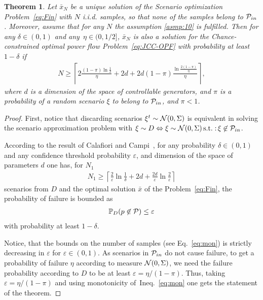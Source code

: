 \documentclass{IEEEtran4PSCC}
\newtheorem{theorem}{Theorem}[section]
\DeclareMathOperator*{\st}{s.t.:}
\newcommand{\cP}{{\cal P}}
\newcommand{\cN}{{\cal N}}
\begin{document}
\begin{theorem}\label{thm:40}
Let $\bar x_N$ be a unique solution of the Scenario optimization Problem~\eqref{eq:Fin} with $N$ i.i.d. samples, so that none of the samples belong to $\cP_{in}$. Moreover, assume that for any $N$ the assumption \ref{asmp:10} is fulfilled. Then for any $\delta \in (0,1)$ and any~$\eta \in (0, 1/2]$, $\bar x_N$ is also a solution for the Chance-constrained optimal power flow Problem~\eqref{eq:JCC-OPF} with probability at least $1-\delta$ if 
\begin{align*}
  N \ge \left\lceil 2\frac{(1-\pi)\ln \frac{1}{\delta}}{\eta} + 2d + 2d (1-\pi) \frac{\ln\frac{2(1-\pi)}{\eta}}{\eta} \right\rceil, 
\end{align*} 
where $d$ is a dimension of the space of controllable generators, and $\pi$ is a probability of a random scenario $\xi$ to belong to $\cP_{in}$, and $\pi < 1$. 
\end{theorem}
\begin{proof}
First, notice that discarding scenarios $\xi^t\sim \cN(0, \Sigma)$ is equivalent in solving the scenario approximation problem with $\xi \sim D \Leftrightarrow \xi\sim \cN(0, \Sigma) \st \xi\not\in \cP_{in}$. 

According to the result of Calafiori and Campi~\cite{calafiore2006scenario}, for any probability $\delta\in (0,1)$ and any confidence threshold probability $\varepsilon$, and dimension of the space of parameters $d$ one has, for $N_1$
\begin{align}\label{eq:mon}
  N_1 \ge \left\lceil \frac{2}{\varepsilon} \ln \frac{1}{\delta} + 2d + \frac{2d}{\varepsilon} \ln \frac{2}{\varepsilon}\right\rceil 
\end{align}
scenarios from $D$ and the optimal solution 
$\bar x$ of the Problem~\eqref{eq:Fin}, 
the probability of failure is bounded as
\begin{align*}
  \mathbb{P}_D(p\not\in \cP) \le \varepsilon
\end{align*}
with probability at least $1-\delta$. 

Notice, that the bounds on the number of samples (see Eq.~\eqref{eq:mon}) is strictly decreasing in $\varepsilon$ for $\varepsilon \in (0,1)$. As scenarios in $\cP_{in}$ do not cause failure, to get a probability of failure $\eta$ according to measure $\cN(0, \Sigma)$, we need the failure probability according to $D$ to be at least $\varepsilon = \eta/(1-\pi)$.  
Thus, taking $\varepsilon = \eta/(1-\pi)$ and using monotonicity of~Ineq.~\eqref{eq:mon} one gets the statement of the theorem. 
\end{proof}
\end{document}
